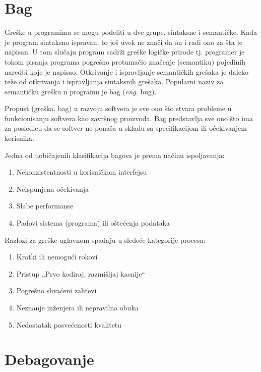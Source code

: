 \documentclass[a4paper]{article}
\begin{document}
\section{Bag}
\label{sec:bag}
Greške u programima se mogu podeliti u dve grupe, sintaksne i semantičke. Kada je program sintaksno ispravan, to još uvek
 ne znači da on i radi ono za šta je napisan. U tom slučaju program sadrži greške logičke prirode tj. programer je tokom 
 pisanja programa pogrešno protumačio značenje (semantiku) pojedinih naredbi koje je napisao. Otkrivanje i ispravljanje 
 semantičkih grešaka je daleko teže od otkrivanja i ispravljanja sintaksnih grešaka. Popularni naziv za semantičku grešku 
 u programu je bag (\textit{eng.} bug).


Propust (greška, bag) u razvoju softvera je sve ono što stvara probleme u funkcionisanju softvera 
kao završnog proizvoda. Bag predstavlja sve ono što ima za posledicu da se softver ne ponaša u 
skladu sa specifikacijom ili očekivanjem korisnika\cite{deb_app}. 

\vspace{4mm}

Jedna od uobičajenih klasifikacija bagova je prema načinu ispoljavanja\cite{deb_app}:
\begin{enumerate}
\item Nekonzistentnosti u korisničkom interfejsu
\item Neispunjena očekivanja
\item Slabe performanse
\item Padovi sistema (programa) ili oštećenja podataka
\end{enumerate}

\vspace{4mm}

Razlozi za greške uglavnom spadaju u sledeće kategorije procesa\cite{deb_app}:
\begin{enumerate}
\item Kratki ili nemogući rokovi
\item Pristup „Prvo kodiraj, razmišljaj kasnije“
\item Pogrešno shvaćeni zahtevi
\item Neznanje inženjera ili nepravilna obuka
\item Nedostatak posvećenosti kvalitetu
\end{enumerate}


\section{Debagovanje}	
\label{sec:debagovanje}
\end{document}
